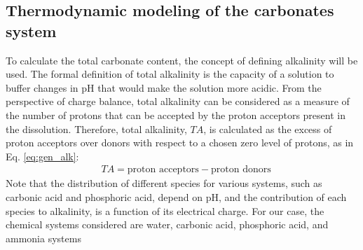 \begin{refsection}[referencesCh3]
%
%

\clearpage

\section{Thermodynamic modeling of the carbonates system} \label{Carbonates}
To calculate the total carbonate content, the concept of defining alkalinity will be used. The formal definition of total alkalinity is the capacity of a solution to buffer changes in pH that would make the solution more acidic.
From the perspective of charge balance, total alkalinity can be considered as a measure of the number of protons that can be accepted by the proton acceptors present in the dissolution. Therefore, total alkalinity, $TA$, is calculated as the excess of proton acceptors over donors with respect to a chosen zero level of protons, as in Eq. \ref{eq:gen_alk}:
\begin{align} 
& TA = \text{proton acceptors} - \text{proton donors} \label{eq:gen_alk}
\end{align}
Note that the distribution of different species for various systems, such as carbonic acid and phosphoric acid, depend on pH, and the contribution of each species to alkalinity, is a function of its electrical charge. For our case, the chemical systems considered are water, carbonic acid, phosphoric acid, and ammonia systems


\end{refsection}
